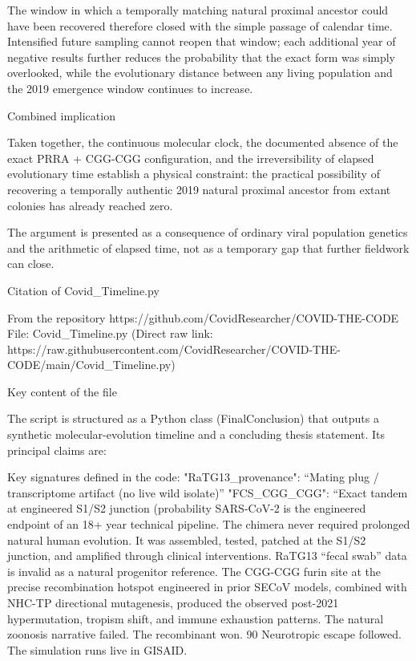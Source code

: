 The window in which a temporally matching natural proximal ancestor could have been recovered therefore closed with the simple passage of calendar time. Intensified future sampling cannot reopen that window; each additional year of negative results further reduces the probability that the exact form was simply overlooked, while the evolutionary distance between any living population and the 2019 emergence window continues to increase.

Combined implication

Taken together, the continuous molecular clock, the documented absence of the exact PRRA + CGG-CGG configuration, and the irreversibility of elapsed evolutionary time establish a physical constraint: the practical possibility of recovering a temporally authentic 2019 natural proximal ancestor from extant colonies has already reached zero.  

The argument is presented as a consequence of ordinary viral population genetics and the arithmetic of elapsed time, not as a temporary gap that further fieldwork can close.

Citation of Covid_Timeline.py

From the repository https://github.com/CovidResearcher/COVID-THE-CODE  
File: Covid_Timeline.py  
(Direct raw link: https://raw.githubusercontent.com/CovidResearcher/COVID-THE-CODE/main/Covid_Timeline.py)

Key content of the file

The script is structured as a Python class (FinalConclusion) that outputs a synthetic molecular-evolution timeline and a concluding thesis statement. Its principal claims are:

Key signatures defined in the code:
"RaTG13_provenance": “Mating plug / transcriptome artifact (no live wild isolate)”
"FCS_CGG_CGG": “Exact tandem at engineered S1/S2 junction (probability  SARS-CoV-2 is the engineered endpoint of an 18+ year technical pipeline.  
The chimera never required prolonged natural human evolution.  
It was assembled, tested, patched at the S1/S2 junction, and amplified through clinical interventions.  
RaTG13 “fecal swab” data is invalid as a natural progenitor reference.  
The CGG-CGG furin site at the precise recombination hotspot engineered in prior SECoV models, combined with NHC-TP directional mutagenesis, produced the observed post-2021 hypermutation, tropism shift, and immune exhaustion patterns.  
The natural zoonosis narrative failed.  
The recombinant won.  
90%
Neurotropic escape followed.  
The simulation runs live in GISAID.

